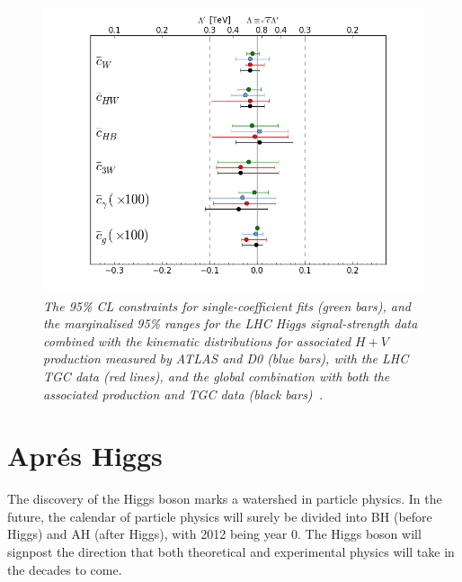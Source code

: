 \documentclass[12pt]{article}
\numberwithin{equation}{section}
\begin{document}
\begin{figure}[ht]
\centering
\includegraphics[scale=0.4]{ESY_Summary95CLbounds.png}
\caption{\it The 95\% CL constraints for single-coefficient fits (green bars),
and the marginalised 95\% ranges for the
LHC Higgs signal-strength data combined with the kinematic distributions for associated $H + V$ production
measured by ATLAS and D0 (blue bars), with the LHC TGC data (red lines), and the global combination with
both the associated production and TGC data (black bars)~\protect\cite{ESY4}.}
\label{fig:dim6}
\end{figure}

\section{Apr\'es Higgs}

The discovery of the Higgs boson marks a watershed in particle physics.
In the future, the calendar of particle physics will surely be divided into BH (before Higgs) and AH (after Higgs), with
2012 being year 0. The Higgs boson will signpost the direction that both theoretical and experimental
physics will take in the decades to come.
\end{document}
